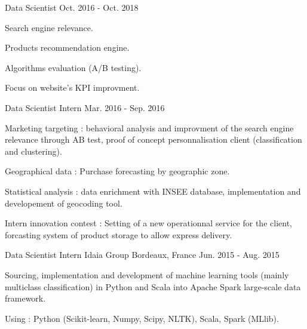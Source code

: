 \begin{cventries}
  \cventry
    {Data Scientist} %
    {} %
    {} %
    {Oct. 2016 - Oct. 2018} %
    {
      \begin{cvitems} %
        \item {Search engine relevance.}
        \item {Products recommendation engine.}
        \item {Algorithms evaluation (A/B testing).}
        \item {Focus on website's KPI improvment.}
      \end{cvitems}
    }

  \cventry
    {Data Scientist Intern} %
    {} %
    {} %
    {Mar. 2016 - Sep. 2016} %
    {
      \begin{cvitems} %
        \item {Marketing targeting : behavioral analysis and improvment of the search engine relevance through AB test, proof of concept personnalisation client (classification and clustering).}
        \item {Geographical data : Purchase forecasting by geographic zone.}
        \item {Statistical analysis : data enrichment with INSEE database, implementation and developement of geocoding tool.}
        \item {Intern innovation contest : Setting of a new operationnal service for the client, forcasting system of product storage to allow express delivery.}
      \end{cvitems}
    }

  \cventry
    {Data Scientist Intern} %
    {Idaia Group} %
    {Bordeaux, France} %
    {Jun. 2015 - Aug. 2015} %
    {
      \begin{cvitems} %
        \item {Sourcing, implementation and development of machine learning tools (mainly multiclass classification) in Python and Scala into Apache Spark large-scale data framework.}
      \end{cvitems}
      \vspace{9}
      Using : Python (Scikit-learn, Numpy, Scipy, NLTK), Scala, Spark (MLlib).
    }

\end{cventries}
